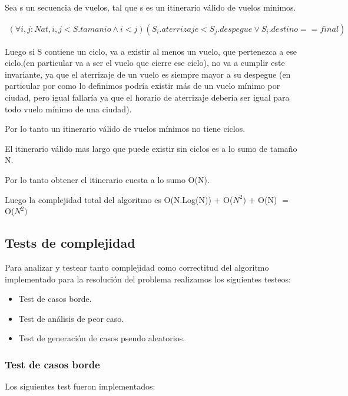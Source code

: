 Sea s un secuencia de vuelos, tal que s es un itinerario v\'alido de vuelos minimos.

\begin{align*}
(\forall i,j:Nat, i,j<S.tamanio \wedge i<j)(S_{i}.aterrizaje < S_{j}.despegue
\vee S_{i}.destino == final)
\end{align*}

Luego si S contiene un ciclo, va a existir al menos un vuelo, que pertenezca a ese ciclo,(en particular va a ser el vuelo que cierre ese ciclo), no va a cumplir este invariante, ya que el aterrizaje de un vuelo es siempre mayor a su despegue (en particular por como lo definimos podr\'ia existir m\'as de un vuelo m\'inimo por ciudad, pero igual fallar\'ia ya que el horario de aterrizaje deber\'ia ser igual para todo vuelo m\'inimo de una ciudad).

Por lo tanto un itinerario v\'alido de vuelos m\'inimos no tiene ciclos. 

El itinerario v\'alido mas largo que puede existir sin ciclos es a lo sumo de tamaño N.

Por lo tanto obtener el itinerario cuesta a lo sumo O(N).


Luego la complejidad total del algoritmo es O(N.Log(N)) + O($N^{2})$ + O(N) $=$ O($N^{2})$
\subsection{Tests de complejidad}

Para analizar y testear tanto complejidad como correctitud del algoritmo implementado para la resoluci\'on del problema  realizamos los siguientes testeos:

\begin{itemize}
  \item Test de casos borde.
  \item Test de an\'alisis de peor caso.
  \item Test de generaci\'on de casos pseudo aleatorios.
\end{itemize}

\newpage

\subsubsection{Test de casos borde}


Los siguientes test fueron implementados:

